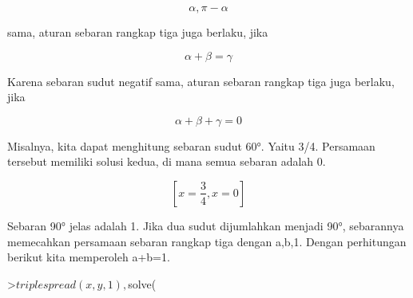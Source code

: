 \documentclass[a4paper,10pt]{article}
\begin{document}
\begin{eulernotebook}
\begin{eulercomment}
\begin{eulercomment}
\begin{eulercomment}
\begin{eulercomment}
\begin{eulercomment}
\begin{eulercomment}
\begin{eulercomment}
\begin{eulercomment}
\begin{eulercomment}
\begin{eulercomment}
\begin{eulercomment}
\begin{eulercomment}
\begin{eulercomment}
\begin{eulercomment}
\begin{eulercomment}
\begin{eulercomment}
\begin{eulercomment}
\begin{eulercomment}
\begin{eulercomment}
\begin{eulercomment}
\begin{eulercomment}
\begin{eulercomment}
\begin{eulercomment}
\begin{eulercomment}
\begin{eulercomment}
\begin{eulercomment}
\begin{eulercomment}
\begin{eulercomment}
\begin{eulercomment}
\begin{eulercomment}
\begin{eulercomment}
\begin{eulercomment}
\begin{eulercomment}
\end{eulercomment}
\begin{eulerformula}
\[
\alpha, \pi-\alpha
\]
\end{eulerformula}
\begin{eulercomment}
sama, aturan sebaran rangkap tiga juga berlaku, jika

\end{eulercomment}
\begin{eulerformula}
\[
\alpha+\beta=\gamma
\]
\end{eulerformula}
\begin{eulercomment}
Karena sebaran sudut negatif sama, aturan sebaran rangkap tiga juga
berlaku, jika

\end{eulercomment}
\begin{eulerformula}
\[
\alpha+\beta+\gamma=0
\]
\end{eulerformula}
\begin{eulercomment}
Misalnya, kita dapat menghitung sebaran sudut 60°. Yaitu 3/4.
Persamaan tersebut memiliki solusi kedua, di mana semua sebaran adalah
0.
\end{eulercomment}
\begin{eulerformula}
\[
\left[ x=\frac{3}{4} , x=0 \right] 
\]
\end{eulerformula}
\begin{eulercomment}
Sebaran 90° jelas adalah 1. Jika dua sudut dijumlahkan menjadi 90°,
sebarannya memecahkan persamaan sebaran rangkap tiga dengan a,b,1.
Dengan perhitungan berikut kita memperoleh a+b=1.
\end{eulercomment}
\begin{eulerprompt}
>$triplespread(x,y,1), $solve(%
\end{eulerprompt}

\end{eulercomment}
\end{eulercomment}
\end{eulercomment}
\end{eulercomment}
\end{eulercomment}
\end{eulercomment}
\end{eulercomment}
\end{eulercomment}
\end{eulercomment}
\end{eulercomment}
\end{eulercomment}
\end{eulercomment}
\end{eulercomment}
\end{eulercomment}
\end{eulercomment}
\end{eulercomment}
\end{eulercomment}
\end{eulercomment}
\end{eulercomment}
\end{eulercomment}
\end{eulercomment}
\end{eulercomment}
\end{eulercomment}
\end{eulercomment}
\end{eulercomment}
\end{eulercomment}
\end{eulercomment}
\end{eulercomment}
\end{eulercomment}
\end{eulercomment}
\end{eulercomment}
\end{eulercomment}
\end{eulernotebook}
\end{document}
